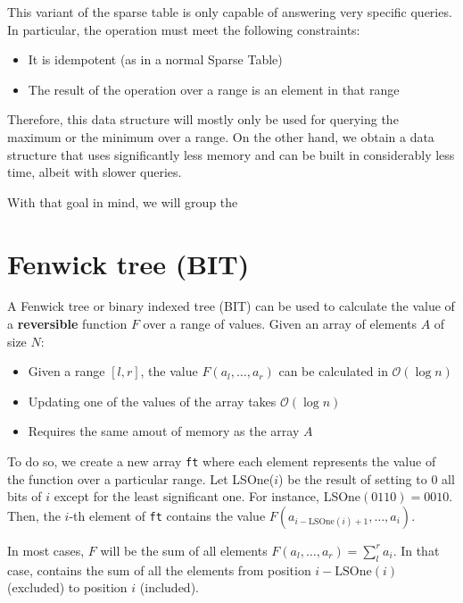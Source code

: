 \documentclass[12pt]{report}
\newcommand{\tbf}[1]{\textbf{\boldmath #1}}
\begin{document}
This variant of the sparse table is only capable of answering very
specific queries. In particular, the operation must meet the following
constraints:
\begin{itemize}
		\setlength{\itemsep}{2pt}
		\item It is idempotent (as in a normal Sparse Table)
		\item The result of the operation over a range is an element
				in that range
\end{itemize}
Therefore, this data structure will mostly only be used for querying the
maximum or the minimum over a range. On the other hand, we obtain a data 
structure that uses significantly less memory and can be built in
considerably less time, albeit with slower queries.

With that goal in mind, we will group the 


\begin{figure}[h!]
		\centering
\end{figure}

\newpage
\section{Fenwick tree (BIT)}
A Fenwick tree or binary indexed tree (BIT) can be used to calculate the value
of a \textbf{reversible} function $F$ over a range of values. Given an array of elements
$A$ of size $N$:
\begin{itemize}
		\setlength{\itemsep}{2pt}
		\item Given a range $[l,r]$, the value $F(a_l,\dots, a_r)$ can be calculated
				in \tbf{$\mathcal{O}(\log n)$}
		\item Updating one of the values of the array takes \tbf{$\mathcal{O}(\log n)$}
		\item Requires the same amout of memory as the array $A$
\end{itemize}
To do so, we create a new array \texttt{ft} where each element represents
the value of the function over a particular range. Let LSOne($i$) be the 
result of setting to 0 all bits of $i$ except for the least significant one.
For instance, LSOne$(0110)=0010$. Then, the $i$-th element of \texttt{ft} 
contains the value $F(a_{i-\text{LSOne}(i)+1},\dots, a_{i})$. 

In most cases, $F$ will be the sum of all elements $F(a_l,\dots, a_r)=\sum_l^r{a_i}$.
In that case,  contains the sum of all the elements from 
position $i-\text{LSOne}(i)$ (excluded) to position $i$ (included).
\end{document}
